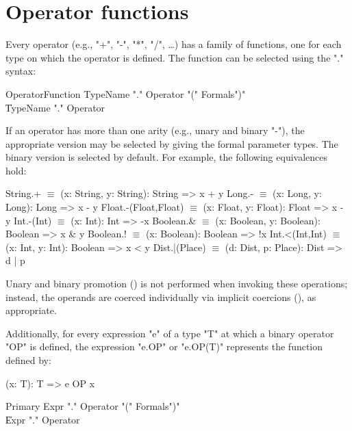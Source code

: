 \section{Operator functions}
\label{OperatorFunction}
Every operator (e.g.,
\xcd"+",
\xcd"-",
\xcd"*",
\xcd"/",
\dots) has a family of functions, one for
each type on which the operator is defined. The function can be
selected using the "." syntax:

\begin{grammar}
OperatorFunction
        \: TypeName \xcd"." Operator \xcd"(" Formals\opt \xcd")" \\
        \| TypeName \xcd"." Operator \\
\end{grammar}

If an operator has more than one arity (e.g., unary and binary
\xcd"-"), the appropriate version may be selected by giving the
formal parameter types.  The binary version is selected by
default.
For example, the following equivalences hold:

\begin{xtenmath}
String.+             $\equiv$ (x: String, y: String): String => x + y
Long.-               $\equiv$ (x: Long, y: Long): Long => x - y
Float.-(Float,Float) $\equiv$ (x: Float, y: Float): Float => x - y
Int.-(Int)           $\equiv$ (x: Int): Int => -x
Boolean.&            $\equiv$ (x: Boolean, y: Boolean): Boolean => x & y
Boolean.!            $\equiv$ (x: Boolean): Boolean => !x
Int.<(Int,Int)       $\equiv$ (x: Int, y: Int): Boolean => x < y
Dist.|(Place)        $\equiv$ (d: Dist, p: Place): Dist => d | p
\end{xtenmath}

Unary and binary promotion () is not performed
when invoking these
operations; instead, the operands are coerced individually via implicit
coercions (), as appropriate.

Additionally, for every expression \xcd"e" of a type \xcd"T" at which a binary
operator \xcd"OP" is defined, the expression \xcd"e.OP" or
\xcd"e.OP(T)" represents the function
defined by:

\begin{xten}
(x: T): T => { e OP x }
\end{xten}

\begin{grammar}
Primary \: Expr \xcd"." Operator \xcd"(" Formals\opt \xcd")" \\
        \| Expr \xcd"." Operator \\
\end{grammar}

